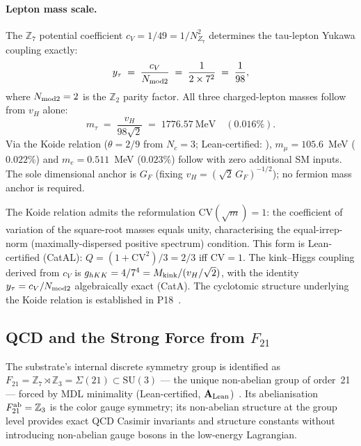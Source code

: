 \paragraph{Lepton mass scale.}
The $\mathbb{Z}_7$ potential coefficient $c_V = 1/49 = 1/N_{Z_7}^2$ determines
the tau-lepton Yukawa coupling exactly:
\[
  y_\tau \;=\; \frac{c_V}{N_{\rm mod2}} \;=\; \frac{1}{2 \times 7^2} \;=\; \frac{1}{98},
\]
where $N_{\rm mod2} = 2$ is the $\mathbb{Z}_2$ parity factor.  All three
charged-lepton masses follow from $v_H$ alone:
\[
  m_\tau \;=\; \frac{v_H}{98\sqrt{2}} \;=\; 1776.57~\text{MeV} \quad (0.016\%).
\]
Via the Koide relation ($\theta = 2/9$ from $N_c = 3$; Lean-certified:
), $m_\mu = 105.6$~MeV ($0.022\%$) and
$m_e = 0.511$~MeV ($0.023\%$) follow with zero additional SM inputs.
The sole dimensional anchor is $G_F$ (fixing $v_H = (\sqrt{2}\,G_F)^{-1/2}$);
no fermion mass anchor is required.

The Koide relation admits the reformulation $\mathrm{CV}(\sqrt{m}) = 1$: the
coefficient of variation of the square-root masses equals unity, characterising
the equal-irrep-norm (maximally-dispersed positive spectrum) condition.  This form
is Lean-certified (CatAL): $Q = (1 + \mathrm{CV}^2)/3 = 2/3$ iff $\mathrm{CV} = 1$.
The kink--Higgs coupling derived from $c_V$ is
$g_{hKK} = 4/7^4 = M_{\rm kink}/(v_H/\sqrt{2})$,
with the identity $y_\tau = c_V/N_{\rm mod2}$ algebraically exact (CatA).
The cyclotomic structure underlying the Koide relation is established in P18~\cite{Spivack2026_Koide}.

\subsection{QCD and the Strong Force from \texorpdfstring{$F_{21}$}{F21}}
\label{subsec:overview-qcd}

The substrate's internal discrete symmetry group is identified as
$F_{21} = \mathbb{Z}_7 \rtimes \mathbb{Z}_3 = \Sigma(21) \subset \mathrm{SU}(3)$ ---
the unique non-abelian group of order~21 --- forced by MDL minimality (Lean-certified,
$\mathbf{A}_{\rm Lean}$)~\cite{SpivackCompUniversality,SpivackGTEUnification}.
Its abelianisation $F_{21}^{\rm ab} = \mathbb{Z}_3$ is the color gauge symmetry; its
non-abelian structure at the group level provides exact QCD Casimir invariants and
structure constants without introducing non-abelian gauge bosons in the low-energy
Lagrangian.

